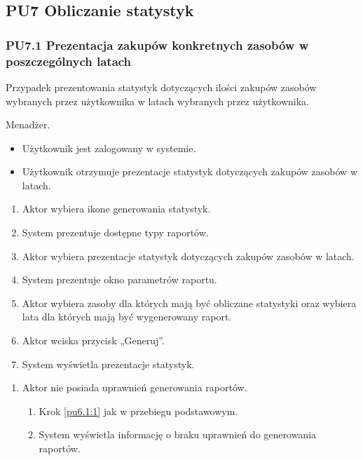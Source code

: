 \subsection{PU7 Obliczanie statystyk} \label{pu7}
\subsubsection{PU7.1 Prezentacja zakupów konkretnych zasobów w poszczególnych latach}
Przypadek prezentowania statystyk dotyczących ilości zakupów zasobów wybranych przez użytkownika w latach wybranych przez użytkownika.

Menadżer.

\begin{itemize}
\item Użytkownik jest zalogowany w systemie.
\end{itemize}

\begin{itemize}
\item Użytkownik otrzymuje prezentacje statystyk dotyczących zakupów zasobów w latach.
\end{itemize}

\begin{enumerate}
	\item \label{pu7.1:1} Aktor wybiera ikone generowania statystyk.
	\item System prezentuje dostępne typy raportów.
	\item \label{pu7.2:2} Aktor wybiera prezentacje statystyk dotyczących zakupów zasobów w latach.
	\item System prezentuje okno parametrów raportu.
	\item Aktor wybiera zasoby dla których mają być obliczane statystyki oraz wybiera lata dla których mają być wygenerowany raport.
	\item Aktor wciska przycisk „Generuj”.
	\item System wyświetla prezentacje statystyk.
\end{enumerate}

\begin{enumerate}
	\item Aktor nie posiada uprawnień generowania raportów.
	\begin{enumerate}[label*=\arabic*.]
		\item Krok \ref{pu6.1:1} jak w przebiegu podstawowym.
		\item System wyświetla informację o braku uprawnień do generowania raportów.
	\end{enumerate}
\end{enumerate}

